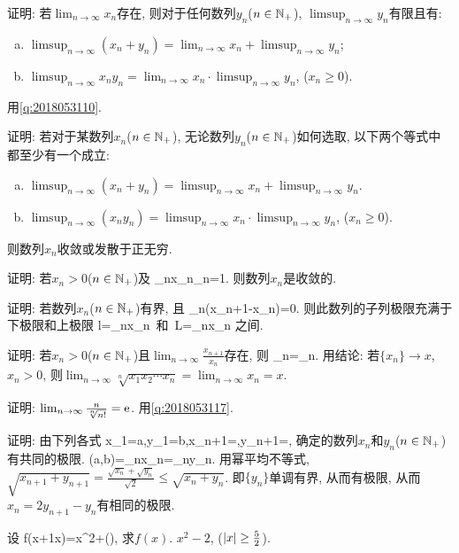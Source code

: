 \bq{}{}
证明: 若$\lim_{n\to\infty}x_n$存在, 则对于任何数列$y_n$($n\in\mathbb{N}_{+}$), $\limsup_{n\to\infty}y_n$有限且有:
\begin{enumerate}[(a)]
 \item $\limsup_{n\to\infty}(x_n+y_n)=\lim_{n\to\infty}x_n+\limsup_{n\to\infty}y_n$;
 \item $\limsup_{n\to\infty}x_ny_n=\lim_{n\to\infty}x_n\cdot\limsup_{n\to\infty}y_n$, ($x_n\ge0$).
\end{enumerate}
\eq
\ba
用\ref{q:2018053110}.
\ea

\bq{}{}
证明: 若对于某数列$x_n$($n\in\mathbb{N}_{+}$), 无论数列$y_n$($n\in\mathbb{N}_{+}$)如何选取, 以下两个等式中都至少有一个成立:
\begin{enumerate}[(a)]
 \item $\limsup_{n\to\infty}(x_n+y_n)=\limsup_{n\to\infty}x_n+\limsup_{n\to\infty}y_n$.
 \item $\limsup_{n\to\infty}(x_ny_n)=\limsup_{n\to\infty}x_n\cdot\limsup_{n\to\infty}y_n$, ($x_n\ge0$).
\end{enumerate}
则数列$x_n$收敛或发散于正无穷.
\eq

\bq{}{}
证明: 若$x_n>0$($n\in\mathbb{N}_{+}$)及
\bee
\limsup_{n\to\infty}x_n\cdot\limsup_{n\to\infty}=1.
\eee
则数列$x_n$是收敛的.
\eq

\bq{}{}
证明: 若数列$x_n$($n\in\mathbb{N}_{+}$)有界, 且
\bee
\lim_{n\to\infty}(x_{n+1}-x_n)=0.
\eee
则此数列的子列极限充满于下极限和上极限
\bee
l=\liminf_{n\to\infty}x_n\  \textrm{和}\ L=\limsup_{n\to\infty}x_n
\eee
之间.
\eq

证明: 若$x_n>0$($n\in\mathbb{N}_{+}$)且$\lim_{n\to\infty}\frac{x_{n+1}}{x_n}$存在, 则
\bee
\lim_{n\to\infty}=\lim_{n\to\infty}.
\eee
\eq
\ba
用结论: 若$\{x_n\}\to x$, $x_n>0$, 则$\lim_{n\to\infty}\sqrt[n]{x_1x_2\cdots x_n}=\lim_{n\to\infty}x_n=x$.
\ea

\bq{}{}
证明: $\lim_{n\to\infty}\frac{n}{\sqrt[n]{n!}}=\mathrm{e}$.
\eq
\ba
用\ref{q:2018053117}.
\ea

证明: 由下列各式
\bee
x_1=a,\quad y_1=b,\quad x_{n+1}=,\quad y_{n+1}=,
\eee
确定的数列$x_n$和$y_n$($n\in\mathbb{N}_{+}$)有共同的极限.
\bee
\m(a,b)=\lim_{n\to\infty}x_n=\lim_{n\to\infty}y_n.
\eee
\eq
\ba
用幂平均不等式, $\sqrt{x_{n+1}+y_{n+1}}=\frac{\sqrt{x_n}+\sqrt{y_{n}}}{\sqrt{2}}\le\sqrt{x_n+y_n}$.
即$\{y_n\}$单调有界, 从而有极限, 从而$x_n=2y_{n+1}-y_n$有相同的极限.
\ea

\bq{}{}
设
\bee
f\left(x+\frac1x\right)=x^2+\quad(),
\eee
求$f(x)$.
\eq
\ba
$x^2-2$, ($\left\lvert x\right\rvert\ge\frac52$).
\ea

